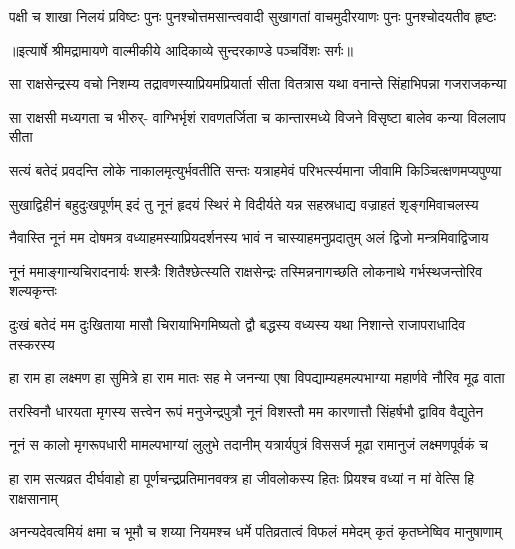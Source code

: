 \fourlineindentedshloka
{पक्षी च शाखा निलयं प्रविष्टः}
{पुनः पुनश्चोत्तमसान्त्ववादी}
{सुखागतां वाचमुदीरयाणः}
{पुनः पुनश्चोदयतीव हृष्टः} %


{॥इत्यार्षे श्रीमद्रामायणे वाल्मीकीये आदिकाव्ये सुन्दरकाण्डे पञ्चविंशः सर्गः॥}


\fourlineindentedshloka
{सा राक्षसेन्द्रस्य वचो निशम्य}
{तद्रावणस्याप्रियमप्रियार्ता}
{सीता वितत्रास यथा वनान्ते}
{सिंहाभिपन्ना गजराजकन्या} %

\fourlineindentedshloka
{सा राक्षसी मध्यगता च भीरुर्-}
{वाग्भिर्भृशं रावणतर्जिता च}
{कान्तारमध्ये विजने विसृष्टा}
{बालेव कन्या विललाप सीता} %

\fourlineindentedshloka
{सत्यं बतेदं प्रवदन्ति लोके}
{नाकालमृत्युर्भवतीति सन्तः}
{यत्राहमेवं परिभर्त्स्यमाना}
{जीवामि किञ्चित्क्षणमप्यपुण्या} %

\fourlineindentedshloka
{सुखाद्विहीनं बहुदुःखपूर्णम्}
{इदं तु नूनं हृदयं स्थिरं मे}
{विदीर्यते यन्न सहस्रधाद्य}
{वज्राहतं शृङ्गमिवाचलस्य} %

\fourlineindentedshloka
{नैवास्ति नूनं मम दोषमत्र}
{वध्याहमस्याप्रियदर्शनस्य}
{भावं न चास्याहमनुप्रदातुम्}
{अलं द्विजो मन्त्रमिवाद्विजाय} %

\fourlineindentedshloka
{नूनं ममाङ्गान्यचिरादनार्यः}
{शस्त्रैः शितैश्छेत्स्यति राक्षसेन्द्रः}
{तस्मिन्ननागच्छति लोकनाथे}
{गर्भस्थजन्तोरिव शल्यकृन्तः} %

\fourlineindentedshloka
{दुःखं बतेदं मम दुःखिताया}
{मासौ चिरायाभिगमिष्यतो द्वौ}
{बद्धस्य वध्यस्य यथा निशान्ते}
{राजापराधादिव तस्करस्य} %

\fourlineindentedshloka
{हा राम हा लक्ष्मण हा सुमित्रे}
{हा राम मातः सह मे जनन्या}
{एषा विपद्याम्यहमल्पभाग्या}
{महार्णवे नौरिव मूढ वाता} %

\fourlineindentedshloka
{तरस्विनौ धारयता मृगस्य}
{सत्त्वेन रूपं मनुजेन्द्रपुत्रौ}
{नूनं विशस्तौ मम कारणात्तौ}
{सिंहर्षभौ द्वाविव वैद्युतेन} %

\fourlineindentedshloka
{नूनं स कालो मृगरूपधारी}
{मामल्पभाग्यां लुलुभे तदानीम्}
{यत्रार्यपुत्रं विससर्ज मूढा}
{रामानुजं लक्ष्मणपूर्वकं च} %

\fourlineindentedshloka
{हा राम सत्यव्रत दीर्घवाहो}
{हा पूर्णचन्द्रप्रतिमानवक्त्र}
{हा जीवलोकस्य हितः प्रियश्च}
{वध्यां न मां वेत्सि हि राक्षसानाम्} %

\fourlineindentedshloka
{अनन्यदेवत्वमियं क्षमा च}
{भूमौ च शय्या नियमश्च धर्मे}
{पतिव्रतात्वं विफलं ममेदम्}
{कृतं कृतघ्नेष्विव मानुषाणाम्} %

